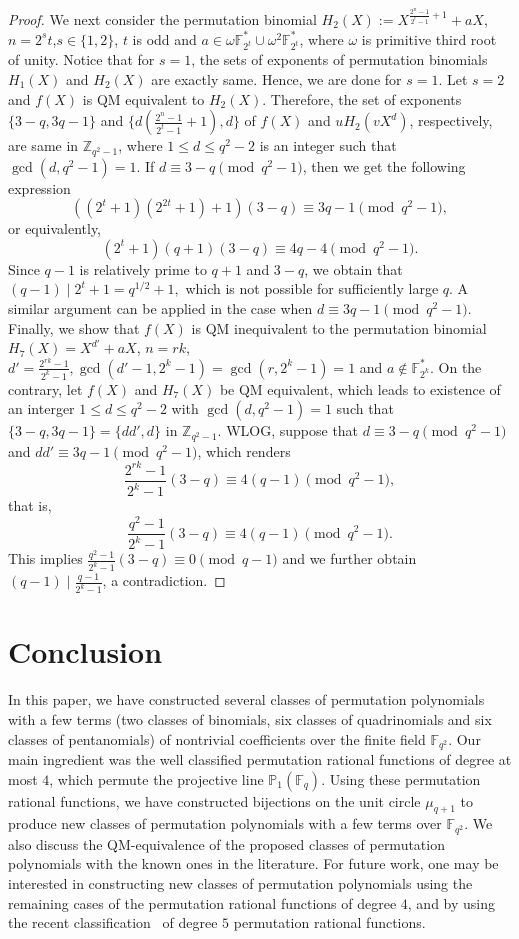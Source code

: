 \documentclass[12pt]{amsart}
\numberwithin{equation}{section}
\theoremstyle{definition}
\newcommand{\F}{\mathbb F}
\newcommand{\bP}{\mathbb P}
\begin{document}
\begin{proof}
We next consider the permutation binomial  $H_2(X):=X^{\frac{2^n-1}{2^t-1}+1}+ aX$, $n=2^st$,$s \in \{1,2\}$, $t$ is odd and $a\in \omega \F_{2^{t}}^{*} \cup \omega^2 \F_{2^{t}}^{*}$, where $\omega$ is primitive third root of unity. Notice that for $s=1$, the sets of exponents of permutation binomials $H_1(X)$ and $H_2(X)$ are exactly same. Hence, we are done for $s=1$. Let $s=2$ and $f(X)$ is QM equivalent to $H_2(X)$. Therefore, the set of exponents $\{3-q,3q-1\}$ and $\{d(\frac{2^n-1}{2^t-1}+1), d\}$ of $f(X)$ and $uH_2(vX^d)$, respectively, are same in $\mathbb{Z}_{q^2-1}$, where $1 \leq d \leq q^2-2$ is an integer such that $\gcd(d,q^2-1)=1$. If $d \equiv 3-q \pmod {q^2-1}$, then we get the following expression
$$((2^t+1)(2^{2t}+1)+1)(3-q) \equiv 3q-1 \pmod {q^2-1},$$
or equivalently,
$$(2^t+1)(q+1)(3-q) \equiv 4q-4 \pmod {q^2-1}.$$
Since $q-1$ is relatively prime to $q+1$ and $3-q$, we obtain that $(q-1) \mid 2^t+1= q^{1/2}+1,$ which is not possible for sufficiently large $q$. A similar argument can be applied in the case when $d \equiv 3q-1 \pmod {q^2-1}$. Finally, we show that $f(X)$ is QM inequivalent to the permutation binomial $H_7(X)=X^{d'}+aX$, $n=rk$, $d'=\frac{2^{rk}-1}{2^k-1}, \gcd(d'-1,2^k-1)=\gcd(r,2^k-1)=1$ and $a \not \in \F_{2^k}^{*}$. On the contrary, let $f(X)$ and $H_7(X)$ be QM equivalent, which leads to existence of an interger $1 \leq d \leq q^2-2$ with $\gcd(d,q^2-1)=1$ such that  $\{3-q,3q-1\}=\{dd', d\}$ in $\mathbb{Z}_{q^2-1}$. WLOG, suppose that $d \equiv 3-q \pmod {q^2-1}$ and $dd'\equiv 3q-1 \pmod {q^2-1}$, which renders 
$$\frac{2^{rk}-1}{2^k-1}(3-q) \equiv 4(q-1) \pmod {q^2-1},$$
that is,
$$\frac{q^2-1}{2^k-1}(3-q) \equiv 4(q-1) \pmod {q^2-1}.$$
This implies $\frac{q^2-1}{2^k-1}(3-q) \equiv 0 \pmod {q-1}$ and we further obtain $(q-1) \mid \frac{q-1}{2^k-1}$, a contradiction.
\end{proof}

\section{Conclusion}\label{S6}
In this paper, we have constructed several classes of permutation polynomials with a few terms (two classes of binomials, six classes of quadrinomials and six classes of pentanomials) of nontrivial coefficients over the finite field $\F_{q^2}$. Our main ingredient was the well classified permutation rational functions of degree at most $4$, which permute the projective line $\bP_1(\F_q)$. Using these permutation rational functions, we have constructed bijections on the unit circle $\mu_{q+1}$ to produce new classes of permutation polynomials with a few terms over $\F_{q^2}$. We also discuss the QM-equivalence of the proposed classes of permutation polynomials with the known ones in the literature. For future work, one may be interested in constructing new classes of permutation polynomials using the remaining cases of the permutation rational functions of degree $4$, and by using the recent classification~\cite{CSze} of degree $5$ permutation rational functions.
\end{document}
